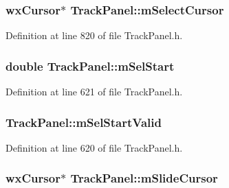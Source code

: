 \subsubsection[{\texorpdfstring{m\+Select\+Cursor}{mSelectCursor}}]{\setlength{\rightskip}{0pt plus 5cm}wx\+Cursor$\ast$ Track\+Panel\+::m\+Select\+Cursor\hspace{0.3cm}{\ttfamily [protected]}}\hypertarget{class_track_panel_a791215c5f5f6a0263f23e10eb971205c}{}\label{class_track_panel_a791215c5f5f6a0263f23e10eb971205c}


Definition at line 820 of file Track\+Panel.\+h.

\subsubsection[{\texorpdfstring{m\+Sel\+Start}{mSelStart}}]{\setlength{\rightskip}{0pt plus 5cm}double Track\+Panel\+::m\+Sel\+Start\hspace{0.3cm}{\ttfamily [protected]}}\hypertarget{class_track_panel_a0d47f68da414e772c1074543a35fe759}{}\label{class_track_panel_a0d47f68da414e772c1074543a35fe759}


Definition at line 621 of file Track\+Panel.\+h.

\subsubsection[{\texorpdfstring{m\+Sel\+Start\+Valid}{mSelStartValid}}]{ Track\+Panel\+::m\+Sel\+Start\+Valid\hspace{0.3cm}{\ttfamily [protected]}}\hypertarget{class_track_panel_ace0a09f928fd1f5a8c3d742df9b3592d}{}\label{class_track_panel_ace0a09f928fd1f5a8c3d742df9b3592d}


Definition at line 620 of file Track\+Panel.\+h.

\subsubsection[{\texorpdfstring{m\+Slide\+Cursor}{mSlideCursor}}]{\setlength{\rightskip}{0pt plus 5cm}wx\+Cursor$\ast$ Track\+Panel\+::m\+Slide\+Cursor\hspace{0.3cm}{\ttfamily [protected]}}\hypertarget{class_track_panel_aeb18d7c6402c4b5c7c626fab5bcec748}{}\label{class_track_panel_aeb18d7c6402c4b5c7c626fab5bcec748}


